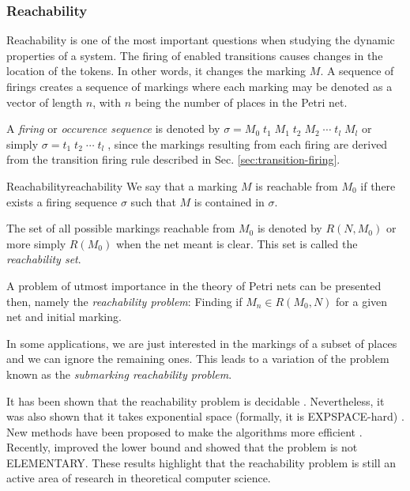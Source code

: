 \subsubsection{Reachability}
\label{sec:reachability}

Reachability is one of the most important questions
when studying the dynamic properties of a system.
The firing of enabled transitions causes changes in the location of the tokens.
In other words, it changes the marking $M$.
A sequence of firings creates a sequence of markings
where each marking may be denoted as a vector of length $n$,
with $n$ being the number of places in the Petri net.

A \emph{firing} or \emph{occurence sequence} is denoted by
$ \sigma = M_0\; t_1\; M_1\; t_2\; M_2\; \cdots\; t_l\; M_l$ or simply
$ \sigma = t_1\; t_2\; \cdots\; t_l\; $, since the markings
resulting from each firing are derived
from the transition firing rule described in Sec. \ref{sec:transition-firing}.

\begin{definition}{Reachability}{reachability}
      We say that a marking $M$ is reachable from $M_0$
      if there exists a firing sequence $\sigma$ such that $M$ is contained in $\sigma$.
\end{definition}

The set of all possible markings reachable from $M_0$ is denoted by $R(N, M_0)$ or more simply
$R(M_0)$ when the net meant is clear.
This set is called the \emph{reachability set}.

A problem of utmost importance in the theory of Petri nets can be presented then,
namely the \emph{reachability problem}:
Finding if $M_n \in R(M_0, N)$ for a given net and initial marking.

In some applications, we are just interested in the markings of a subset of places
and we can ignore the remaining ones.
This leads to a variation of the problem known as the \emph{submarking reachability problem}.

It has been shown that the reachability problem is decidable \cite{mayr1981}.
Nevertheless, it was also shown that it takes exponential space
(formally, it is EXPSPACE-hard) \cite{lipton1976}.
New methods have been proposed to make the algorithms more efficient \cite{kungas2005petri}.
Recently, \cite{czerwinski2020reachability} improved
the lower bound and showed that the problem is not ELEMENTARY.
These results highlight that the reachability problem is still
an active area of research in theoretical computer science.

